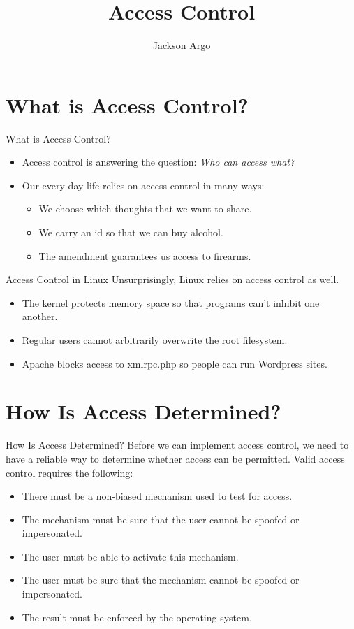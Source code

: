 \documentclass{beamer}
\title[Access Control]{Access Control}
\author{Jackson Argo}
\institute{Rackspace MO After-hours}
\begin{document}
\begin{frame}
  \titlepage
\end{frame}


\begin{frame}
  \tableofcontents
\end{frame}

\section{What is Access Control?}

\begin{frame}{What is Access Control?}
\begin{itemize}
\item Access control is answering the question: \textit{Who can access what?}
\item Our every day life relies on access control in many ways:
\begin{itemize}
\item We choose which thoughts that we want to share.
\item We carry an id so that we can buy alcohol.
\item The  amendment guarantees us access to firearms.
\end{itemize}
\end{itemize}
\end{frame}

\begin{frame}{Access Control in Linux}
Unsurprisingly, Linux relies on access control as well.
\begin{itemize}	
\item The kernel protects memory space so that programs can't inhibit one another.
\item Regular users cannot arbitrarily overwrite the root filesystem. 
\item Apache blocks access to xmlrpc.php so people can run Wordpress sites.
\end{itemize}
\end{frame}

\section{How Is Access Determined?}

\begin{frame}{How Is Access Determined?}
Before we can implement access control, we need to have a reliable way to determine whether access can be permitted. Valid access control requires the following:
\begin{itemize}
\item There must be a non-biased mechanism used to test for access.
\item The mechanism must be sure that the user cannot be spoofed or impersonated.
\item The user must be able to activate this mechanism.
\item The user must be sure that the mechanism cannot be spoofed or impersonated.
\item The result must be enforced by the operating system.
\end{itemize}
\end{frame}
\end{document}
